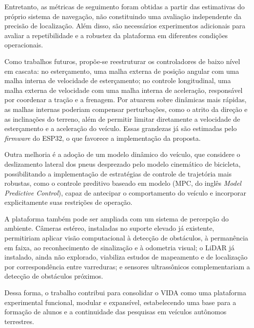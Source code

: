 Entretanto, as métricas de seguimento foram obtidas a partir das estimativas do próprio sistema de navegação, não constituindo uma avaliação independente da precisão de localização. Além disso, são necessários experimentos adicionais para avaliar a repetibilidade e a robustez da plataforma em diferentes condições operacionais.

Como trabalhos futuros, propõe-se reestruturar os controladores de baixo nível em cascata: no esterçamento, uma malha externa de posição angular com uma malha interna de velocidade de esterçamento; no controle longitudinal, uma malha externa de velocidade com uma malha interna de aceleração, responsável por coordenar a tração e a frenagem. Por atuarem sobre dinâmicas mais rápidas, as malhas internas poderiam compensar perturbações, como o atrito da direção e as inclinações do terreno, além de permitir limitar diretamente a velocidade de esterçamento e a aceleração do veículo. Essas grandezas já são estimadas pelo \textit{firmware} do ESP32, o que favorece a implementação da proposta.

Outra melhoria é a adoção de um modelo dinâmico do veículo, que considere o deslizamento lateral dos pneus desprezado pelo modelo cinemático de bicicleta, possibilitando a implementação de estratégias de controle de trajetória mais robustas, como o controle preditivo baseado em modelo (MPC, do inglês \textit{Model Predictive Control}), capaz de antecipar o comportamento do veículo e incorporar explicitamente suas restrições de operação.

A plataforma também pode ser ampliada com um sistema de percepção do ambiente. Câmeras estéreo, instaladas no suporte elevado já existente, permitiriam aplicar visão computacional à detecção de obstáculos, à permanência em faixa, ao reconhecimento de sinalização e à odometria visual; o LiDAR já instalado, ainda não explorado, viabiliza estudos de mapeamento e de localização por correspondência entre varreduras; e sensores ultrassônicos complementariam a detecção de obstáculos próximos. 

Dessa forma, o trabalho contribui para consolidar o VIDA como uma plataforma experimental funcional, modular e expansível, estabelecendo uma base para a formação de alunos e a continuidade das pesquisas em veículos autônomos terrestres.